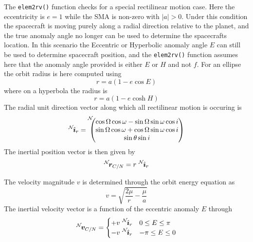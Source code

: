 The {\tt elem2rv()} function checks for a special rectilinear motion case.  Here the eccentricity is $e = 1$ while the SMA is non-zero with $|a|>0$.  Under this condition the spacecraft is moving purely along a radial direction relative to the planet, and the true anomaly angle no longer can be used to determine the spacecrafts location.  In this scenario the Eccentric or Hyperbolic anomaly angle $E$ can still be used to determine spacecraft position, and the {\tt elem2rv()} function assumes here that the anomaly angle provided is either $E$ or $H$ and not $f$.  For an ellipse the orbit radius is here computed using\cite{schaub}
\begin{equation}
	r = a (1 - e \cos E)
\end{equation}
where on a hyperbola the radius is
\begin{equation}
	r = a(1 - e \cosh H)
\end{equation}
The radial unit direction vector along which all rectilinear motion is occuring is
\begin{equation}
	\leftexp{N}{\hat{\bm\imath}}_{r}=\leftexp{N\!\!\!}{\begin{pmatrix}
\cos\Omega\cos\omega 
- \sin\Omega\sin\omega\cos i \\ 
\sin\Omega\cos\omega + \cos\Omega\sin\omega\cos 
i \\
 \sin\theta\sin i 
 \end{pmatrix}}
\end{equation}
The inertial position vector is then given by
\begin{equation}
\leftexp{N}{\bm r}_{C/N} =r \ \leftexp{N}{\hat{\bm\imath}}_{r}
\end{equation}


The velocity magnitude $v$ is determined through the orbit energy equation as\cite{schaub}
\begin{equation}
	v = \sqrt{ \frac{2 \mu}{r} - \frac{\mu}{a} }
\end{equation}
The inertial velocity vector is a function of the eccentric anomaly $E$ through
\begin{equation}
	\leftexp{N}{\bm v}_{C/N} = \begin{cases}
		+v \ \leftexp{N}{\hat{\bm\imath}}_{r}  & 0 \le E \le \pi \\
		-v  \ \leftexp{N}{\hat{\bm\imath}}_{r} & -\pi \le E \le 0
	\end{cases}
\end{equation}





